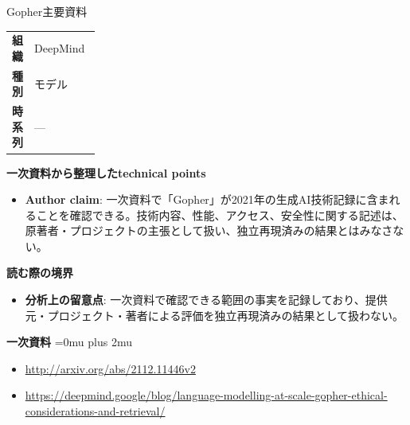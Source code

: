 \begin{technicalnote}{Gopher}{主要資料}
\begingroup
\begin{tabularx}{\linewidth}{@{}>{\bfseries}p{0.22\linewidth}X@{}}
組織 & DeepMind \\
種別 & モデル \\
時系列 & — \\
\end{tabularx}
\smallskip
{\bfseries 一次資料から整理したtechnical points}
\begin{itemize}[leftmargin=1.5em,itemsep=0.35em]
\item \textbf{Author claim}: 一次資料で「Gopher」が2021年の生成AI技術記録に含まれることを確認できる。技術内容、性能、アクセス、安全性に関する記述は、原著者・プロジェクトの主張として扱い、独立再現済みの結果とはみなさない。
\end{itemize}
\begin{minipage}{\linewidth}
{\bfseries 読む際の境界}
\begin{itemize}[leftmargin=1.5em,itemsep=0.35em]
\item \textbf{分析上の留意点}: 一次資料で確認できる範囲の事実を記録しており、提供元・プロジェクト・著者による評価を独立再現済みの結果として扱わない。
\end{itemize}
\begin{samepage}
{\bfseries 一次資料}
\begingroup\sloppy
\Urlmuskip=0mu plus 2mu\relax
\begin{itemize}[leftmargin=1.5em,itemsep=0.25em]
\item {\scriptsize\url{http://arxiv.org/abs/2112.11446v2}}
\item {\scriptsize\url{https://deepmind.google/blog/language-modelling-at-scale-gopher-ethical-considerations-and-retrieval/}}
\end{itemize}
\endgroup
\end{samepage}
\end{minipage}
\endgroup
\end{technicalnote}
\medskip

